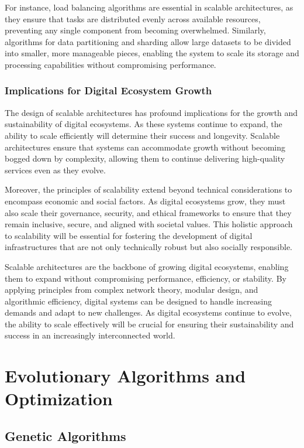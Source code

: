 \documentclass[12pt,twoside]{article}
\begin{document}
For instance, load balancing algorithms are essential in scalable architectures, as they ensure that tasks are distributed evenly across available resources, preventing any single component from becoming overwhelmed. Similarly, algorithms for data partitioning and sharding allow large datasets to be divided into smaller, more manageable pieces, enabling the system to scale its storage and processing capabilities without compromising performance.


\subsubsection{Implications for Digital Ecosystem Growth}

The design of scalable architectures has profound implications for the growth and sustainability of digital ecosystems. As these systems continue to expand, the ability to scale efficiently will determine their success and longevity. Scalable architectures ensure that systems can accommodate growth without becoming bogged down by complexity, allowing them to continue delivering high-quality services even as they evolve.

Moreover, the principles of scalability extend beyond technical considerations to encompass economic and social factors. As digital ecosystems grow, they must also scale their governance, security, and ethical frameworks to ensure that they remain inclusive, secure, and aligned with societal values. This holistic approach to scalability will be essential for fostering the development of digital infrastructures that are not only technically robust but also socially responsible.

Scalable architectures are the backbone of growing digital ecosystems, enabling them to expand without compromising performance, efficiency, or stability. By applying principles from complex network theory, modular design, and algorithmic efficiency, digital systems can be designed to handle increasing demands and adapt to new challenges. As digital ecosystems continue to evolve, the ability to scale effectively will be crucial for ensuring their sustainability and success in an increasingly interconnected world.

\section{Evolutionary Algorithms and Optimization}

\subsection{Genetic Algorithms}
\end{document}
